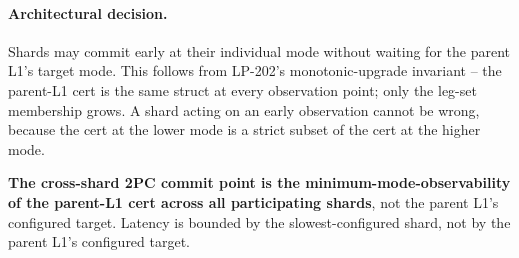 \paragraph{Architectural decision.} Shards may commit early at
their individual mode without waiting for the parent L1's target
mode. This follows from LP-202's monotonic-upgrade invariant -- the
parent-L1 cert is the same struct at every observation point; only
the leg-set membership grows. A shard acting on an early
observation cannot be wrong, because the cert at the lower mode is
a strict subset of the cert at the higher mode.

\textbf{The cross-shard 2PC commit point is the
minimum-mode-observability of the parent-L1 cert across all
participating shards}, not the parent L1's configured target.
Latency is bounded by the slowest-configured shard, not by the
parent L1's configured target.
